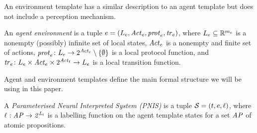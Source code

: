     





An environment template has a similar description to an agent template but does
not include a perception mechanism.

\begin{definition}
An {\em agent environment} is a tuple ${e} = \left ( L_{e}, \mathit{Act}_{e}, \mathit{prot}_{e}, \mathit{tr}_{e}  \right )$, where $L_{e}  \subseteq \mathbb R^{m_e}$ is a nonempty
(possibly) infinite set of local states, $\mathit{Act}_{e}$ is a nonempty and finite set
of actions,  $\mathit{prot}_{e} \colon L_{e}\rightarrow 2^{\mathit{Act}_{e}} \setminus \left \{ \emptyset \right \}$ is a local
protocol function, and $\mathit{tr}_{e} \colon L_{e} \times \mathit{Act}_{e} \times 2^{\mathit{Act}_{t}} 
\rightarrow L_{e}$ is a local transition function.
\end{definition}

Agent and environment templates define the main formal structure we will be
using in this paper.

\begin{definition}%
  A \emph{Parameterised Neural Interpreted System (PNIS)} is a tuple $\mathcal S
  = \left ( {t}, {e}, \ell \right )$, where $\ell_{} : \it{AP} \rightarrow
  2^{L_{t}}$ is a labelling function on the agent  template states for a set
  $\it{AP}$ of atomic propositions.
\end{definition}

